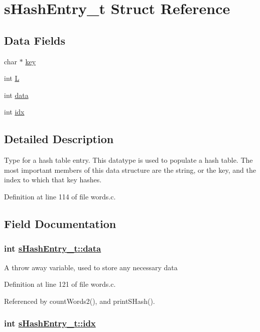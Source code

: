 \hypertarget{structsHashEntry__t}{
\section{s\-Hash\-Entry\_\-t Struct Reference}
\label{structsHashEntry__t}
}
\subsection*{Data Fields}
\begin{CompactItemize}
\item 
char $\ast$ \hyperlink{structsHashEntry__t_o0}{key}
\item 
int \hyperlink{structsHashEntry__t_o1}{L}
\item 
int \hyperlink{structsHashEntry__t_o2}{data}
\item 
int \hyperlink{structsHashEntry__t_o3}{idx}
\end{CompactItemize}


\subsection*{Detailed Description}
Type for a hash table entry. This datatype is used to populate a hash table. The most important members of this data structure are the string, or the key, and the index to which that key hashes.



Definition at line 114 of file words.c.

\subsection*{Field Documentation}
\hypertarget{structsHashEntry__t_o2}{
\subsubsection[data]{\setlength{\rightskip}{0pt plus 5cm}int \hyperlink{structsHashEntry__t_o2}{s\-Hash\-Entry\_\-t::data}}}
\label{structsHashEntry__t_o2}


A throw away variable, used to store any necessary data 

Definition at line 121 of file words.c.

Referenced by count\-Words2(), and print\-SHash().\hypertarget{structsHashEntry__t_o3}{
\subsubsection[idx]{\setlength{\rightskip}{0pt plus 5cm}int \hyperlink{structsHashEntry__t_o3}{s\-Hash\-Entry\_\-t::idx}}}
\label{structsHashEntry__t_o3}


